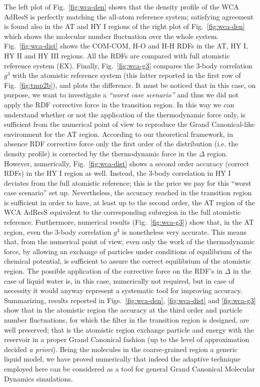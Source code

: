 \documentclass[aps,a4paper,reprint,onecolumn]{revtex4}
\newcommand{\HY}{{\Delta}}
\begin{document}
  The left plot of Fig.~\ref{fig:wca-den} shows that
  the density profile of the
  WCA AdResS is perfectly matching the all-atom reference system; satisfying agreement is found also in the AT and HY I regions of the right plot of Fig.~\ref{fig:wca-den} which shows the molecular
  number fluctuation over the whole system.
Fig.~\ref{fig:wca-dist} shows the COM-COM, H-O and H-H
    RDFs in the AT, HY I, HY II and HY III regions.
    All the RDFs are compared with full atomistic reference system (EX).
    Finally, Fig.~\ref{fig:wca-g3} compares the 3-body correlation $g^3$
    with the atomistic reference
    system (this latter reported in the first row of Fig.~\ref{fig:tmp2b}), and plots the difference. It must be noticed that in this case, on purpose, we want to investigate a {\it ``worst case scenario''} and thus we did not apply the RDF corrective force in the transition region. In this way we can understand whether or not the application of the thermodynamic force only, is sufficient from the numerical point of view to reproduce the Grand Canonical-like environment for the AT region.
    According to our theoretical framework, in absence RDF corrective force only the first order of the distribution (i.e. the density profile)
    is corrected by the thermodynamic force in the $\HY$ region.
    However, numerically, Fig.~\ref{fig:wca-dist} shows a second order accuracy (correct RDFs) in the HY I region as well. Instead, the 3-body
    correlation in HY I deviates from the full atomistic reference; this is the price we pay for this ``worst case scenario'' set up. Nevertheless, the accuracy reached in the transition region is sufficient in order to have, at least up to the second order, the AT region of the WCA AdResS equivalent to the corresponding subregion in the full atomistic reference.
    Furthermore, numerical results  (Fig.~\ref{fig:wca-g3}) show that, in the AT region, even the 3-body correlation $g^3$ is nonetheless very accurate. 
  This means that, from the numerical point of view, even only the work of the thermodynamic force, by allowing an exchange of particles under conditions of equilibrium of the chemical potential, is sufficient to assure the correct equilibrium of the atomistic region. The possible application of the corrective force on the RDF's in $\Delta$ in the case of liquid water is, in this case, numerically not required, but in case of necessity it would anyway represent a systematic tool for improving accuracy. 
  Summarizing, results reported in Figs.~\ref{fig:wca-den}, \ref{fig:wca-dist} and \ref{fig:wca-g3} show that in the atomistic region the accuracy at the third order and particle number fluctuations, for which the filter in the transition region is designed, are well preserved; that is the atomistic region exchange particle and energy with the reservoir in a proper Grand Canonical fashion (up to the level of approximation decided {\it a priori}). Being the molecules in the coarse-grained region a generic liquid model, we have proved numerically that indeed the adaptive technique employed here can be considered as a tool for general Grand Canonical Molecular Dynamics simulations.  
\end{document}
